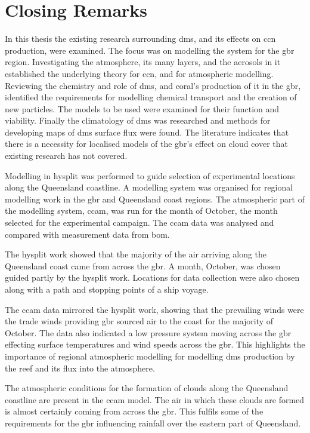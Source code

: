 \section{Closing Remarks}
\label{sec:closerem}

In this thesis the existing research surrounding \gls{dms}, and its effects on \gls{ccn} production, were examined. The focus was on modelling the system for the \gls{gbr} region. Investigating the atmosphere, its many layers, and the aerosols in it established the underlying theory for \gls{ccn}, and for atmospheric modelling. Reviewing the chemistry and role of \gls{dms}, and coral's production of it in the \gls{gbr}, identified the requirements for modelling chemical transport and the creation of new particles. The models to be used were examined for their function and viability. Finally the climatology of \gls{dms} was researched and methods for developing maps of \gls{dms} surface flux were found. The literature indicates that there is a necessity for localised models of the \gls{gbr}'s effect on cloud cover that existing research has not covered.

Modelling in \gls{hysplit} was performed to guide selection of experimental locations along the Queensland coastline. A modelling system was organised for regional modelling work in the \gls{gbr} and Queensland coast regions. The atmospheric part of the modelling system, \gls{ccam}, was run for the month of October, the month selected for the experimental campaign. The \gls{ccam} data was analysed and compared with measurement data from \gls{bom}.

The \gls{hysplit} work showed that the majority of the air arriving along the Queensland coast came from across the \gls{gbr}. A month, October, was chosen guided partly by the \gls{hysplit} work. Locations for data collection were also chosen along with a path and stopping points of a ship voyage.

The \gls{ccam} data mirrored the \gls{hysplit} work, showing that the prevailing winds were the trade winds providing \gls{gbr} sourced air to the coast for the majority of October. The data also indicated a low pressure system moving across the \gls{gbr} effecting surface temperatures and wind speeds across the \gls{gbr}. This highlights the importance of regional atmospheric modelling for modelling \gls{dms} production by the reef and its flux into the atmosphere.

The atmospheric conditions for the formation of clouds along the Queensland coastline are present in the \gls{ccam} model. The air in which these clouds are formed is almost certainly coming from across the \gls{gbr}. This fulfils some of the requirements for the \gls{gbr} influencing rainfall over the eastern part of Queensland. 

